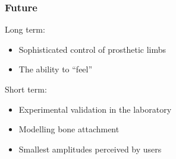 \begin{frame}
    \frametitle{Future}

    Long term:
    \begin{itemize}
        \item Sophisticated control of prosthetic limbs
        \item The ability to ``feel''
    \end{itemize}

    Short term:
    \begin{itemize}
        \item Experimental validation in the laboratory
        \item Modelling bone attachment
        \item Smallest amplitudes perceived by users
    \end{itemize}

\end{frame}